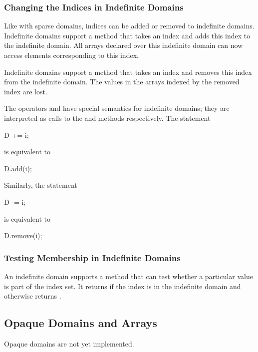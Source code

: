 \subsubsection{Changing the Indices in Indefinite Domains}

Like with sparse domains, indices can be added or removed to
indefinite domains.  Indefinite domains support a method 
that takes an index and adds this index to the indefinite domain.  All
arrays declared over this indefinite domain can now access elements
corresponding to this index.

Indefinite domains support a method  that takes an index
and removes this index from the indefinite domain.  The values in the
arrays indexed by the removed index are lost.

The operators \chpl{+=} and \chpl{-=} have special semantics for
indefinite domains; they are interpreted as calls to the 
and  methods respectively.  The statement
\begin{chapel}
D += i;
\end{chapel}
is equivalent to
\begin{chapel}
D.add(i);
\end{chapel}
Similarly, the statement
\begin{chapel}
D -= i;
\end{chapel}
is equivalent to
\begin{chapel}
D.remove(i);
\end{chapel}

\subsubsection{Testing Membership in Indefinite Domains}

An indefinite domain supports a  method that can test
whether a particular value is part of the index set. It
returns  if the index is in the indefinite domain and
otherwise returns .

\subsection{Opaque Domains and Arrays}
\label{Opaque_Domains_and_Arrays}

\begin{implementation}
Opaque domains are not yet implemented.
\end{implementation}

